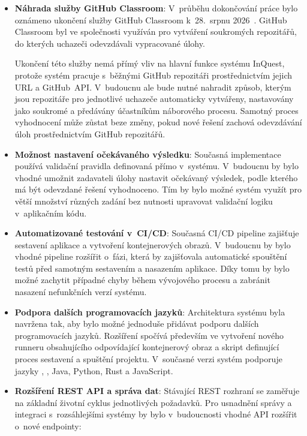 \documentclass[
  biblatex,
  figures,
  tables,
  glossaries,
  index
]{kidiplom}
\begin{document}
\begin{itemize}
	\item \textbf{Náhrada služby GitHub Classroom}:
	V~průběhu dokončování práce bylo oznámeno ukončení služby GitHub Classroom k~28.~srpnu 2026~\cite{githubclasssupp}. GitHub Classroom byl ve společnosti využíván pro vytváření soukromých repozitářů, do kterých uchazeči odevzdávali vypracované úlohy.

	Ukončení této služby nemá přímý vliv na hlavní funkce systému InQuest, protože systém pracuje s~běžnými GitHub repozitáři prostřednictvím jejich URL a GitHub~API. V~budoucnu ale bude nutné nahradit způsob, kterým jsou repozitáře pro jednotlivé uchazeče automaticky vytvářeny, nastavovány jako soukromé a předávány účastníkům náborového procesu. Samotný proces vyhodnocení může zůstat beze změny, pokud nové řešení zachová odevzdávání úloh prostřednictvím GitHub repozitářů.

	\item \textbf{Možnost nastavení očekávaného výsledku}:
	Současná implementace používá validační pravidla definovaná přímo v~systému. V~budoucnu by bylo vhodné umožnit zadavateli úlohy nastavit očekávaný výsledek, podle kterého má být odevzdané řešení vyhodnoceno. Tím by bylo možné systém využít pro větší množství různých zadání bez nutnosti upravovat validační logiku v~aplikačním kódu. 

	\item \textbf{Automatizované testování v~CI/CD}:
	Současná CI/CD pipeline zajišťuje sestavení aplikace a vytvoření kontejnerových obrazů. V~budoucnu by bylo vhodné pipeline rozšířit o~fázi, která by zajišťovala automatické spouštění testů před samotným sestavením a nasazením aplikace. Díky tomu by bylo možné zachytit případné chyby během vývojového procesu a zabránit nasazení nefunkčních verzí systému.
	
	\item \textbf{Podpora dalších programovacích jazyků}:
	Architektura systému byla navržena tak, aby bylo možné jednoduše přidávat podporu dalších programovacích jazyků. Rozšíření spočívá především ve vytvoření nového runneru obsahujícího odpovídající kontejnerový obraz a skript definující proces sestavení a spuštění projektu. V~současné verzi systém podporuje jazyky \csharp{}, \cpp{}, Java, Python, Rust a JavaScript.
	
	\item \textbf{Rozšíření REST API a správa dat}:
	Stávající REST rozhraní se zaměřuje na základní životní cyklus jednotlivých požadavků. Pro usnadnění správy a integraci s~rozsáhlejšími systémy by bylo v~budoucnosti vhodné API rozšířit o~nové endpointy:
	

\end{itemize}
\end{document}
